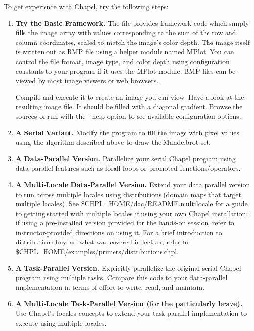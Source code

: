 \documentclass[10pt]{article}
\begin{document}
\vspace{5pt}
\noindent To get experience with Chapel, try the following steps:
\begin{enumerate}
\item {\bf Try the Basic Framework.} The file 
  provides framework code which simply fills the image array with
  values corresponding to the sum of the row and column coordinates,
  scaled to match the image's color depth. The image itself
  is written out as BMP file using a helper module named MPlot.
  You can control the file format,
  image type, and color depth using configuration constants
  to your program if it uses the MPlot module.
  BMP files can be viewed by most image viewers or web
  browsers.

  Compile  and execute it to create an image you can
  view. Have a look at the resulting image file.  It should be filled with
  a diagonal gradient.  Browse the sources or run with the -{}-help option
  to see available configuration options.

\item {\bf A Serial Variant.} 
  Modify the program to fill the image with pixel values using the
  algorithm described above to draw the Mandelbrot set.

\item {\bf A Data-Parallel Version.} 
  Parallelize your serial Chapel program using data parallel features
  such as forall loops or promoted functions/operators.

\item {\bf A Multi-Locale Data-Parallel Version.} 
  Extend your data parallel version to run across multiple locales
  using distributions (domain maps that target multiple locales).  See
  \$CHPL\_HOME/doc/README.multilocale for a guide to getting started
  with multiple locales if using your own Chapel installation; if
  using a pre-installed version provided for the hands-on session,
  refer to instructor-provided directions on using it.  For a brief
  introduction to distributions beyond what was covered in lecture,
  refer to \$CHPL\_HOME/examples/primers/distributions.chpl.

\item {\bf A Task-Parallel Version.} 
  Explicitly parallelize the original serial Chapel program using
  multiple tasks.  Compare this code to your data-parallel
  implementation in terms of effort to write, read, and maintain.

\item {\bf A Multi-Locale Task-Parallel Version (for the particularly brave).} 
  Use Chapel's locales concepts to extend your task-parallel
  implementation to execute using multiple locales.

\end{enumerate}
\end{document}
